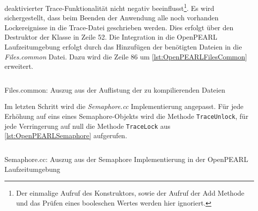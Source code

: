 deaktivierter Trace-Funktionalität nicht negativ beeinflusst\footnote{Der
einmalige Aufruf des Konstruktors, sowie der Aufruf der Add Methode und das
Prüfen eines booleschen Wertes werden hier ignoriert.}. Es wird sichergestellt,
dass beim Beenden der Anwendung alle noch vorhanden Lockereignisse in die
Trace-Datei geschrieben werden. Dies erfolgt über den Destruktor der Klasse in
Zeile 52. Die Integration in die OpenPEARL Laufzeitumgebung erfolgt durch das
Hinzufügen der benötigten Dateien in die \emph{Files.common} Datei. Dazu wird
die Zeile 86 um \cref{lst:OpenPEARLFilesCommon} erweitert.
\begin{listing}[ht]
  \inputminted[frame=lines,linenos,firstline=86,lastline=88]{bash}{./OpenPEARL/Files.common}
  \caption{Files.common: Auszug aus der Auflistung der zu kompilierenden Dateien}
  \label{lst:OpenPEARLFilesCommon}
\end{listing}
Im letzten Schritt wird die \emph{Semaphore.cc} Implementierung angepasst. Für
jede Erhöhung auf eins eines Semaphore-Objekts wird die Methode
\texttt{TraceUnlock}, für jede Verringerung auf null die Methode
\texttt{TraceLock} aus \cref{lst:OpenPEARLSemaphore} aufgerufen.
\begin{listing}[ht]
  \inputminted[frame=lines,linenos,firstline=93,lastline=111]{cpp}{./OpenPEARL/Semaphore.cc}
  \caption{Semaphore.cc: Auszug aus der Semaphore Implementierung in der OpenPEARL Laufzeitumgebung}
  \label{lst:OpenPEARLSemaphore}
\end{listing}

